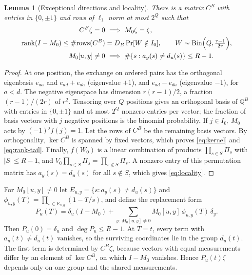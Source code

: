 \documentclass[11pt,reqno]{amsart}
\numberwithin{equation}{section}
\theoremstyle{plain}
\newtheorem{lemma}[theorem]{Lemma}
\theoremstyle{definition}
\theoremstyle{remark}
\newcommand{\Q}{\mathbb Q}
\newcommand{\rank}{\operatorname{rank}}
\begin{document}
\begin{lemma}[Exceptional directions and locality]\label{lem:matrix}
There is a matrix $C^B$ with entries in $\{0,\pm1\}$ and rows of $\ell_1$
norm at most $2^Q$ such that
\begin{align}
 C^B\zeta=0&\ \Longrightarrow\ M_0\zeta=\zeta,\label{eq:kernel}\\
 \rank(I-M_0)\le\#\mathrm{rows}(C^B)&=D_B\Pr[W\notin I_0],\qquad
 W\sim\operatorname{Bin}\Bigl(Q,\tfrac{r-1}{2r}\Bigr),\label{eq:rank-tail}\\
 M_0[u,y]\ne0&\ \Longrightarrow\ \#\{s:a_y(s)\ne d_u(s)\}\le R-1.\label{eq:locality}
\end{align}
\end{lemma}
\begin{proof}
At one position, the exchange on ordered pairs has the orthogonal eigenbasis
$e_{aa}$ and $e_{ad}+e_{da}$ (eigenvalue $+1$), and $e_{ad}-e_{da}$
(eigenvalue $-1$), for $a<d$. The negative eigenspace has dimension
$r(r-1)/2$, a fraction $(r-1)/(2r)$ of $r^2$. Tensoring over $Q$ positions
gives an orthogonal basis of $\Q^B$ with entries in $\{0,\pm1\}$ and at most
$2^Q$ nonzero entries per vector; the fraction of basis vectors with $j$
negative positions is the binomial probability. If $j\in I_0$, $M_0$ acts by
$(-1)^jf(j)=1$. Let the rows of $C^B$ be the remaining basis vectors. By
orthogonality, $\ker C^B$ is spanned by fixed vectors, which proves
\eqref{eq:kernel} and \eqref{eq:rank-tail}. Finally, $f(W_0)$ is a linear
combination of products $\prod_{s\in S}\Pi_s$ with $|S|\le R-1$, and
$V_0\prod_{s\in S}\Pi_s=\prod_{s\notin S}\Pi_s$. A nonzero entry of this
permutation matrix has $a_y(s)=d_u(s)$ for all $s\notin S$, which gives
\eqref{eq:locality}.
\end{proof}

For $M_0[u,y]\ne0$ let $E_{u,y}=\{s:a_y(s)\ne d_u(s)\}$ and
$\phi_{u,y}(T)=\prod_{s\in E_{u,y}}(1-T/s)$, and define the replacement form
\begin{equation}\label{eq:replacement}
 P_u(T)=\delta_u(I-M_0)+\sum_{y:\,M_0[u,y]\ne0}M_0[u,y]\,\phi_{u,y}(T)\,\delta_y.
\end{equation}
Then $P_u(0)=\delta_u$ and $\deg P_u\le R-1$. At $T=t$, every term with
$a_y(t)\ne d_u(t)$ vanishes, so the surviving coordinates lie in the group
$d_u(t)$. The first term is determined by $C^B\zeta$, because vectors with
equal measurements differ by an element of $\ker C^B$, on which $I-M_0$
vanishes. Hence $P_u(t)\zeta$ depends only on one group and the shared
measurements.
\end{document}

